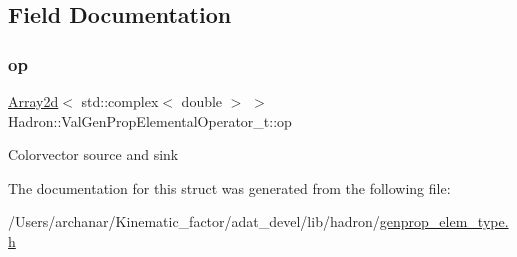 \subsection{Field Documentation}
\mbox{\label{structHadron_1_1ValGenPropElementalOperator__t_a52ab58302100c2cdb47154082c0a3953}} 
\subsubsection{\texorpdfstring{op}{op}}
{\footnotesize\ttfamily \mbox{\hyperlink{classXMLArray_1_1Array2d}{Array2d}}$<$ std\+::complex$<$ double $>$ $>$ Hadron\+::\+Val\+Gen\+Prop\+Elemental\+Operator\+\_\+t\+::op}

Colorvector source and sink 

The documentation for this struct was generated from the following file\+:\begin{DoxyCompactItemize}
\item 
/\+Users/archanar/\+Kinematic\+\_\+factor/adat\+\_\+devel/lib/hadron/\mbox{\hyperlink{lib_2hadron_2genprop__elem__type_8h}{genprop\+\_\+elem\+\_\+type.\+h}}\end{DoxyCompactItemize}
